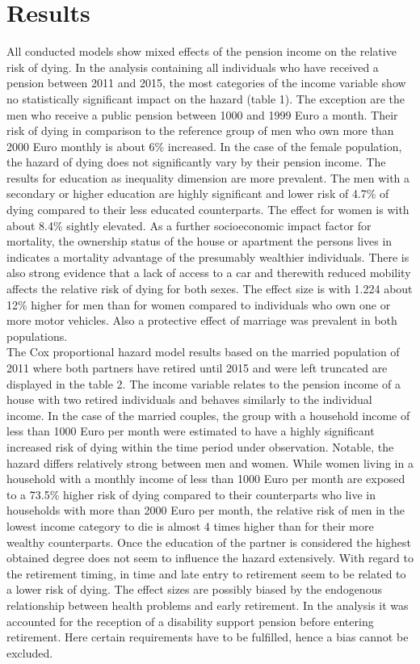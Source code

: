 \documentclass[a4paper,10pt,oneside,english]{article}
\begin{document}
\section*{\textsf{Results}}
All conducted models show mixed effects of the pension income on the relative risk of dying. In the analysis containing all individuals who have received a pension between 2011 and 2015, the most categories of the income variable show no statistically significant impact on the hazard (table 1). The exception are the men who receive a public pension between 1000 and 1999 Euro a month. Their risk of dying in comparison to the reference group of men who own more than 2000 Euro monthly is about 6\% increased. In the case of the female population, the hazard of dying does not significantly vary by their pension income. The results for education as inequality dimension are more prevalent. The men with a secondary or higher education are highly significant and lower risk of 4.7\% of dying compared to their less educated counterparts. The effect for women is with about 8.4\% sightly elevated. As a further socioeconomic impact factor for mortality, the ownership status of the house or apartment the persons lives in indicates a mortality advantage of the presumably wealthier individuals. There is also strong evidence that a lack of access to a car and therewith reduced mobility affects the relative risk of dying for both sexes. The effect size is with 1.224 about 12\% higher for men than for women compared to individuals who own one or more motor vehicles. Also a protective effect of marriage was prevalent in both populations.\\
The Cox proportional hazard model results based on the married population of 2011 where both partners have retired until 2015 and were left truncated are displayed in the table 2. The income variable relates to the pension income of a house with two retired individuals and behaves similarly to the individual income. In the case of the married couples, the group with a household income of less than 1000 Euro per month were estimated to have a highly significant increased risk of dying within the time period under observation. Notable, the hazard differs relatively strong between men and women. While women living in a household with a monthly income of less than 1000 Euro per month are exposed to a 73.5\% higher risk of dying compared to their counterparts who live in households with more than 2000 Euro per month, the relative risk of men in the lowest income category to die is almost 4 times higher than for their more wealthy counterparts. Once the education of the partner is considered the highest obtained degree does not seem to influence the hazard extensively. With regard to the retirement timing, in time and late entry to retirement seem to be related to a lower risk of dying. The effect sizes are possibly biased by the endogenous relationship between health problems and early retirement. In the analysis it was accounted for the reception of a disability support pension before entering retirement. Here certain requirements have to be fulfilled, hence a bias cannot be excluded.
\end{document}
